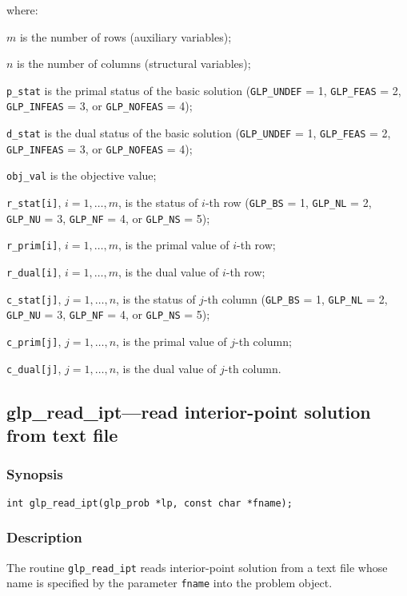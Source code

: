 \noindent
where:

\noindent
$m$ is the number of rows (auxiliary variables);

\noindent
$n$ is the number of columns (structural variables);

\noindent
\verb|p_stat| is the primal status of the basic solution
(\verb|GLP_UNDEF| = 1, \verb|GLP_FEAS| = 2, \verb|GLP_INFEAS| = 3, or
\verb|GLP_NOFEAS| = 4);

\noindent
\verb|d_stat| is the dual status of the basic solution
(\verb|GLP_UNDEF| = 1, \verb|GLP_FEAS| = 2, \verb|GLP_INFEAS| = 3, or
\verb|GLP_NOFEAS| = 4);

\noindent
\verb|obj_val| is the objective value;

\noindent
\verb|r_stat[i]|, $i=1,\dots,m$, is the status of $i$-th row
(\verb|GLP_BS| = 1, \verb|GLP_NL| = 2, \verb|GLP_NU| = 3,
\verb|GLP_NF| = 4, or \verb|GLP_NS| = 5);

\noindent
\verb|r_prim[i]|, $i=1,\dots,m$, is the primal value of $i$-th row;

\noindent
\verb|r_dual[i]|, $i=1,\dots,m$, is the dual value of $i$-th row;

\noindent
\verb|c_stat[j]|, $j=1,\dots,n$, is the status of $j$-th column
(\verb|GLP_BS| = 1, \verb|GLP_NL| = 2, \verb|GLP_NU| = 3,
\verb|GLP_NF| = 4, or \verb|GLP_NS| = 5);

\noindent
\verb|c_prim[j]|, $j=1,\dots,n$, is the primal value of $j$-th column;

\noindent
\verb|c_dual[j]|, $j=1,\dots,n$, is the dual value of $j$-th column.

\subsection{glp\_read\_ipt---read interior-point solution from text
file}

\subsubsection*{Synopsis}

\begin{verbatim}
int glp_read_ipt(glp_prob *lp, const char *fname);
\end{verbatim}

\subsubsection*{Description}

The routine \verb|glp_read_ipt| reads interior-point solution from a
text file whose name is specified by the parameter \verb|fname| into the
problem object.

